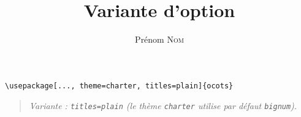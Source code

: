 \documentclass[11pt]{ocots-book}
\title{Variante d'option}
\author{Prénom \textsc{Nom}}
\newcommand{\ocotsvariantnote}[1]{\begin{quote}\itshape Variante : #1\end{quote}}
\begin{document}
\maketitle

\begin{lstlisting}
\usepackage[..., theme=charter, titles=plain]{ocots}
\end{lstlisting}
\ocotsvariantnote{\texttt{titles=plain} (le th\`eme \texttt{charter} utilise par d\'efaut \texttt{bignum}).}

\end{document}
